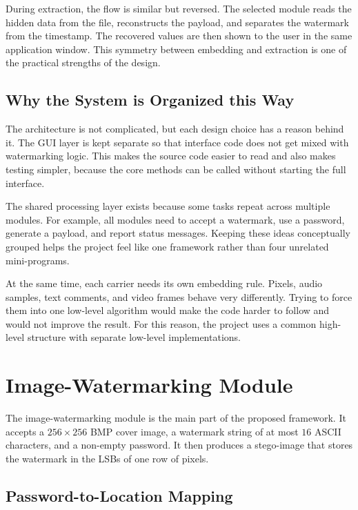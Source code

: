 During extraction, the flow is similar but reversed. The selected module reads the hidden data from the file, reconstructs the payload, and separates the watermark from the timestamp. The recovered values are then shown to the user in the same application window. This symmetry between embedding and extraction is one of the practical strengths of the design.

\subsection{Why the System is Organized this Way}

The architecture is not complicated, but each design choice has a reason behind it. The GUI layer is kept separate so that interface code does not get mixed with watermarking logic. This makes the source code easier to read and also makes testing simpler, because the core methods can be called without starting the full interface.

The shared processing layer exists because some tasks repeat across multiple modules. For example, all modules need to accept a watermark, use a password, generate a payload, and report status messages. Keeping these ideas conceptually grouped helps the project feel like one framework rather than four unrelated mini-programs.

At the same time, each carrier needs its own embedding rule. Pixels, audio samples, text comments, and video frames behave very differently. Trying to force them into one low-level algorithm would make the code harder to follow and would not improve the result. For this reason, the project uses a common high-level structure with separate low-level implementations.

\section{Image-Watermarking Module}
\label{sec:image_module}

The image-watermarking module is the main part of the proposed framework. It accepts a $256 \times 256$ BMP cover image, a watermark string of at most $16$ ASCII characters, and a non-empty password. It then produces a stego-image that stores the watermark in the LSBs of one row of pixels.

\subsection{Password-to-Location Mapping}
\label{sec:password_mapping}

